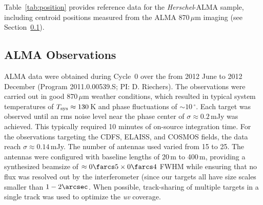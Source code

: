 \documentclass[iop]{emulateapj}
\begin{document}

Table~\ref{tab:position} provides reference data for the {\it Herschel}-ALMA
sample, including centroid positions measured from the ALMA 870$\, \mu$m
imaging (see Section~\ref{sec:almaobs}).

\subsection{ALMA Observations}\label{sec:almaobs}

ALMA data were obtained during Cycle~0 over the from 2012 June to 2012 December
(Program 2011.0.00539.S; PI: D. Riechers).  The observations were carried out
in good 870$\,\mu$m weather conditions, which resulted in typical system
temperatures of $T_{\rm sys} \approx 130\,$K and phase fluctuations of $\sim
10\,^\circ$.  Each target was observed until an rms noise level near the phase
center of $\sigma \approx 0.2\,$mJy was achieved.  This typically required 10
minutes of on-source integration time.  For the observations targeting the
CDFS, ELAISS, and COSMOS fields, the data reach $\sigma \approx 0.14\,$mJy.
The number of antennas used varied from 15 to 25.  The antennas were configured
with baseline lengths of 20$\,$m to 400$\,$m, providing a synthesized beamsize
of $\approx 0\farcs5 \times 0\farcs4$ FWHM while ensuring that no flux was
resolved out by the interferometer (since our targets all have size scales
smaller than $1-2 \arcsec$.  When possible, track-sharing of multiple targets
in a single track was used to optimize the {\it uv} coverage.
\end{document}
